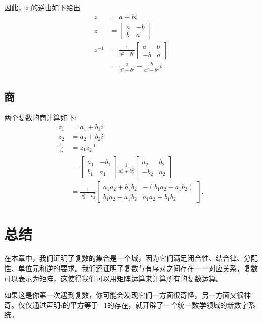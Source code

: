 因此，$z$ 的逆由如下给出
$$
\begin{aligned}
z & =a+b i \\
z & =\left[\begin{array}{cc}
a & -b \\
b & a
\end{array}\right] \\
z^{-1} & =\frac{1}{a^{2}+b^{2}}\left[\begin{array}{cc}
a & b \\
-b & a
\end{array}\right] \\
& =\frac{a}{a^{2}+b^{2}}-\frac{b}{a^{2}+b^{2}} i .
\end{aligned}
$$

\subsection{商}
两个复数的商计算如下:
$$
\begin{aligned}
z_{1} & =a_{1}+b_{1} i \\
z_{2} & =a_{2}+b_{2} i \\
\frac{z_{1}}{z_{2}} & =z_{1} z_{2}^{-1} \\
& =\left[\begin{array}{cc}
a_{1} & -b_{1} \\
b_{1} & a_{1}
\end{array}\right] \frac{1}{a_{2}^{2}+b_{2}^{2}}\left[\begin{array}{cc}
a_{2} & b_{2} \\
-b_{2} & a_{2}
\end{array}\right] \\
& =\frac{1}{a_{2}^{2}+b_{2}^{2}}\left[\begin{array}{cc}
a_{1} a_{2}+b_{1} b_{2} & -\left(b_{1} a_{2}-a_{1} b_{2}\right) \\
b_{1} a_{2}-a_{1} b_{2} & a_{1} a_{2}+b_{1} b_{2}
\end{array}\right] .
\end{aligned}
$$

\section{总结}
在本章中，我们证明了复数的集合是一个域，因为它们满足闭合性、结合律、分配性、单位元和逆的要求。我们还证明了复数与有序对之间存在一一对应关系，复数可以表示为矩阵，这使得我们可以用矩阵运算来计算所有的复数运算。

如果这是你第一次遇到复数，你可能会发现它们一方面很奇怪，另一方面又很神奇。仅仅通过声明$i$的平方等于$-1$的存在，就开辟了一个统一数学领域的新数字系统。

